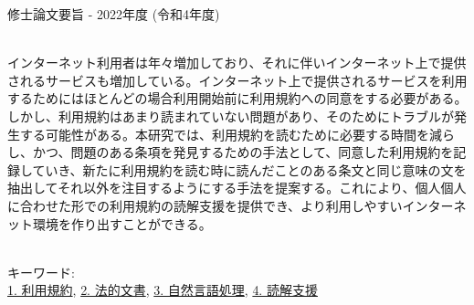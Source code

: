 修士論文要旨 - 2022年度 (令和4年度)
\begin{center}
\begin{large}
\end{large}
\end{center}

~ \\

インターネット利用者は年々増加しており、それに伴いインターネット上で提供されるサービスも増加している。インターネット上で提供されるサービスを利用するためにはほとんどの場合利用開始前に利用規約への同意をする必要がある。しかし、利用規約はあまり読まれていない問題があり、そのためにトラブルが発生する可能性がある。本研究では、利用規約を読むために必要する時間を減らし、かつ、問題のある条項を発見するための手法として、同意した利用規約を記録していき、新たに利用規約を読む時に読んだことのある条文と同じ意味の文を抽出してそれ以外を注目するようにする手法を提案する。これにより、個人個人に合わせた形での利用規約の読解支援を提供でき、より利用しやすいインターネット環境を作り出すことができる。

~ \\
キーワード:\\
\underline{1. 利用規約},
\underline{2. 法的文書},
\underline{3. 自然言語処理},
\underline{4. 読解支援}
\begin{flushright}
\dept \\
\author
\end{flushright}
